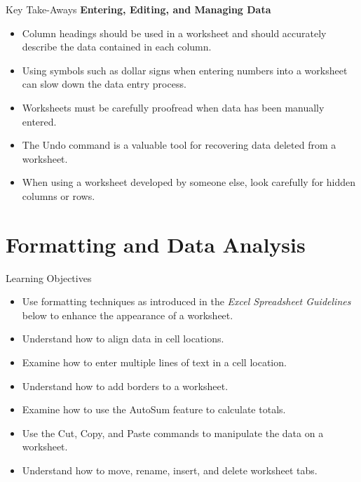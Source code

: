 \begin{center}
	\begin{tkwbox}{Key Take-Aways}
		\textbf{Entering, Editing, and Managing Data}
		\\
		\begin{itemize}
			\setlength{\itemsep}{0pt}
			\setlength{\parskip}{0pt}
			\setlength{\parsep}{0pt}
			
			\item Column headings should be used in a worksheet and should accurately describe the data contained in each column.
			\item Using symbols such as dollar signs when entering numbers into a worksheet can slow down the data entry process.
			\item Worksheets must be carefully proofread when data has been manually entered.
			\item The Undo command is a valuable tool for recovering data deleted from a worksheet.
			\item When using a worksheet developed by someone else, look carefully for hidden columns or rows.
			
		\end{itemize}
	\end{tkwbox}
\end{center}

\section{Formatting and Data Analysis}

\begin{center}
	\begin{objbox}{Learning Objectives}
		\begin{itemize}
			\setlength{\itemsep}{0pt}
			\setlength{\parskip}{0pt}
			\setlength{\parsep}{0pt}
			
			\item Use formatting techniques as introduced in the \textit{Excel Spreadsheet Guidelines} below to enhance the appearance of a worksheet.
			\item Understand how to align data in cell locations.
			\item Examine how to enter multiple lines of text in a cell location.
			\item Understand how to add borders to a worksheet.
			\item Examine how to use the AutoSum feature to calculate totals.
			\item Use the Cut, Copy, and Paste commands to manipulate the data on a worksheet.
			\item Understand how to move, rename, insert, and delete worksheet tabs.
		\end{itemize}
	\end{objbox}
\end{center}

